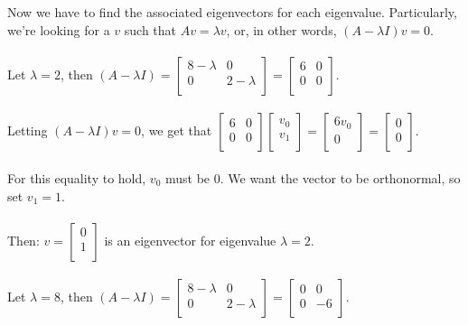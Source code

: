 \documentclass[11pt]{article}
\begin{document}
Now we have to find the associated eigenvectors for each eigenvalue. Particularly, we're looking for a $v$ such that $Av = \lambda v$, or, in other words, $(A - \lambda I)v = 0$. \\\\
Let $\lambda = 2$, then $(A - \lambda I) = \begin{bmatrix}
8 - \lambda & 0 \\
0 & 2 - \lambda \\
\end{bmatrix} = \begin{bmatrix}
6 & 0 \\
0 & 0 \\
\end{bmatrix}$. \\\\
Letting $(A - \lambda I)v = 0$, we get that $ \begin{bmatrix}
6 & 0 \\
0 & 0 \\
\end{bmatrix} \begin{bmatrix}
v_0 \\
v_1 \\
\end{bmatrix} = \begin{bmatrix}
6v_0 \\
0 \\
\end{bmatrix} = \begin{bmatrix}
0 \\
0 \\
\end{bmatrix} $. \\\\
For this equality to hold, $v_0$ must be 0. We want the vector to be orthonormal, so set $v_1 = 1$. \\\\
Then: $v = \begin{bmatrix}
0 \\
1 \\
\end{bmatrix}$ is an eigenvector for eigenvalue $\lambda = 2$. \\\\
Let $\lambda = 8$, then $(A - \lambda I) = \begin{bmatrix}
8 - \lambda & 0 \\
0 & 2 - \lambda \\
\end{bmatrix} = \begin{bmatrix}
0 & 0 \\
0 & -6 \\
\end{bmatrix}$. \\\\
\end{document}

